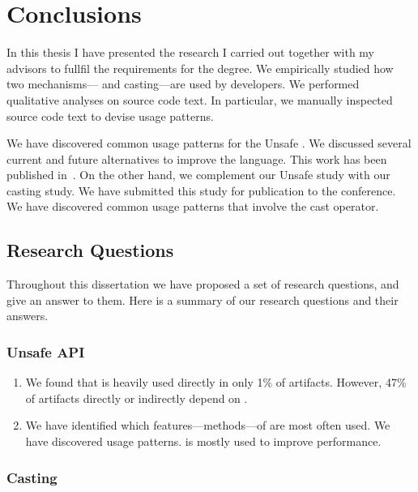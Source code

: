 \chapter{Conclusions}
\label{cha:conclusions}


In this thesis I have presented the research I carried out together with my advisors to fullfil the requirements for the \phd{} degree.
We empirically studied how two mechanisms---\unsafe{} \api{} and casting---are used by \java{} developers.
We performed qualitative analyses on source code text.
In particular, we manually inspected source code text to devise usage patterns.

We have discovered common usage patterns for the \java{} Unsafe \api{}.
We discussed several current and future alternatives to improve the
\java{} language.
This work has been published in~\citep{mastrangeloUseYourOwn2015}.
On the other hand, we complement our Unsafe \api{} study with 
our casting study.
We have submitted this study for publication to the  conference.
We have discovered common usage patterns that involve the cast operator.

\section{Research Questions}

Throughout this dissertation we have proposed a set of research questions,
and give an answer to them.
Here is a summary of our research questions and their answers.

\subsection*{Unsafe API}

\begin{enumerate}[label=\ref{unsafe:rq\arabic*},leftmargin=3.4\parindent]
\item {\bf \urqA} 
We found that \smu{} is heavily used directly in only 1\% of artifacts.
However, 47\% of artifacts directly or indirectly depend on \smu{}.
\item {\bf \urqB} 
We have identified which features---methods---of \smu{} are most often used.
We have discovered \unsafe{} usage patterns.
\smu{} is mostly used to improve performance.
\end{enumerate}

\subsection*{Casting}

